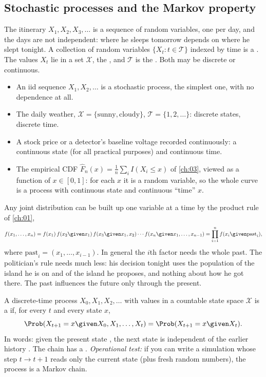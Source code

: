 \subsection{Stochastic processes and the Markov property}
\label{9a:sec:process}

The itinerary $X_1,X_2,X_3,\dots$ is a sequence of random variables, one per day, and the days
are not independent: where he sleeps tomorrow depends on where he slept tonight. A collection
of random variables $\{X_t:t\in\mathcal T\}$ indexed by time is a .
The values $X_t$ lie in a set $\mathcal X$, the , and $\mathcal T$ is the
 . Both may be discrete or continuous.
\begin{itemize}[itemsep=1pt]
  \item An iid sequence $X_1,X_2,\dots$ is a stochastic process, the simplest one, with no
        dependence at all.
  \item The daily weather, $\mathcal X=\{\text{sunny},\text{cloudy}\}$, $\mathcal
        T=\{1,2,\dots\}$: discrete states, discrete time.
  \item A stock price or a detector's baseline voltage recorded continuously: a continuous
        state (for all practical purposes) and continuous time.
  \item The empirical CDF $\widehat F_n(x)=\frac1n\sum_i I(X_i\le x)$ of \cref{ch:03}, viewed
        as a function of $x\in[0,1]$: for each $x$ it is a random variable, so the whole curve
        is a process with continuous state and continuous ``time'' $x$.
\end{itemize}
Any joint distribution can be built up one variable at a time by the product rule of
\cref{ch:01},
\begin{equation}
  f(x_1,\dots,x_n)=f(x_1)\,f(x_2\given x_1)\,f(x_3\given x_1,x_2)\cdots
  f(x_n\given x_1,\dots,x_{n-1})=\prod_{i=1}^n f(x_i\given\text{past}_i),
  \label{9a:eq:product-rule}
\end{equation}
where $\text{past}_i=(x_1,\dots,x_{i-1})$. In general the $i$th factor needs the whole past.
The politician's rule needs much less: his decision tonight uses the population of the island
he is on and of the island he proposes, and nothing about how he got there. The past
influences the future only through the present.

\begin{workdef}
A discrete-time process $X_0,X_1,X_2,\dots$ with values in a countable state space $\mathcal X$
is a  if, for every $t$ and every state $x$,
\begin{equation}
  \Prob(X_{t+1}=x\given X_0,X_1,\dots,X_t)=\Prob(X_{t+1}=x\given X_t).
  \label{9a:eq:markov}
\end{equation}
In words: given the present state , the next state is
independent of the earlier history . The chain has a
.
\emph{Operational test:} if you can write a simulation whose step $t\to t+1$ reads only the
current state (plus fresh random numbers), the process is a Markov chain.
\end{workdef}

